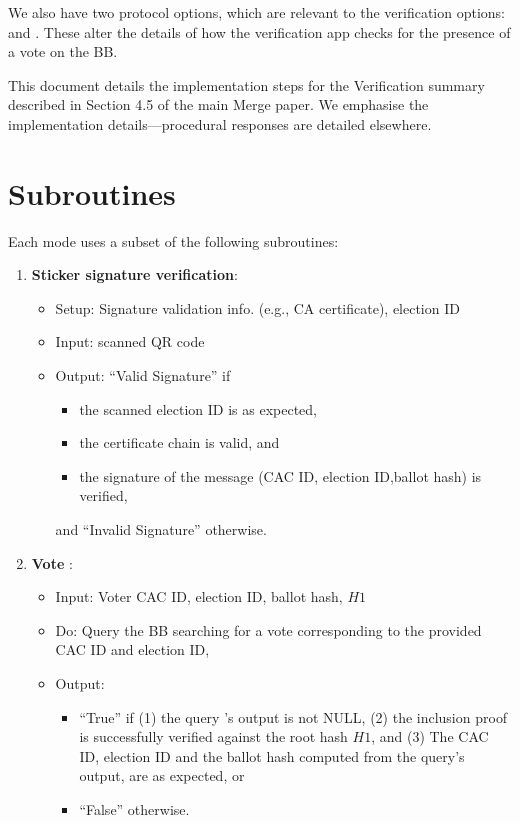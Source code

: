 \documentclass{article}
\begin{document}
    We also have two protocol options, which are relevant to the verification options:
    \BBInclusionCheck{} and \StickerBBUpload{}. These alter the details of how the verification app checks for the presence of a vote on the BB.

    This document details the implementation steps for the Verification summary described in Section 4.5 of the main Merge paper. We emphasise the implementation details---procedural responses are detailed elsewhere.

\section{Subroutines}
Each mode uses a subset of the following subroutines:

\begin{enumerate}
    \item \textbf{Sticker signature verification}:
\begin{itemize}
\item Setup: Signature validation info. (e.g., CA certificate), election ID
    \item Input: scanned QR code
    \item Output: ``Valid Signature'' if 
    \begin{itemize}
        \item the scanned election ID is as expected, 
        \item the certificate chain is valid, and
        \item the signature of the message (CAC ID, election ID,ballot hash) is verified,
    \end{itemize}
    and ``Invalid Signature'' otherwise.
\end{itemize}
\label{Sticker signature verification}
    \item \textbf{Vote \BBInclusionCheck{}}:

\begin{itemize}
    \item    Input: Voter CAC ID, election ID, ballot hash, $H1$
    \item     Do: Query the BB  searching for a vote corresponding to the provided CAC ID and election ID,
    \item Output: 
    \begin{itemize}
        \item ``True'' if (1) the query 's output is not NULL, (2) the inclusion proof is successfully verified against the root hash $H1$, and
        (3) The CAC ID, election ID and the ballot hash computed from the query's output, are as expected, or
        \item ``False'' otherwise.
    \end{itemize}


\end{itemize}
\end{enumerate}
\end{document}
